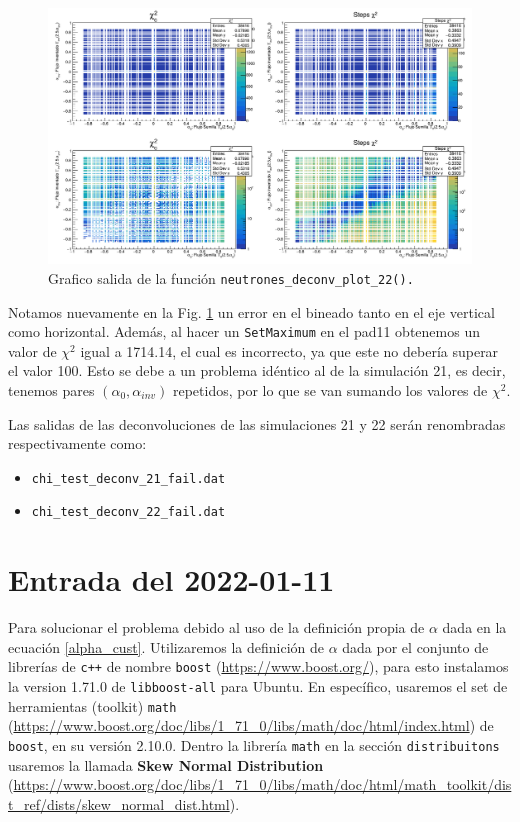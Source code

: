 \documentclass[11pt,letterpaper]{article}
\begin{document}
 \begin{figure}[H]
    \includegraphics[width=1.\textwidth]{img/plot_deconv_22_fail.png}
    \centering
     \cprotect\caption{Grafico salida de la función \verb|neutrones_deconv_plot_22().|} 
\label{neutrones_deconv_plot_22_fail}
\end{figure}

Notamos nuevamente en la  Fig. \ref{neutrones_deconv_plot_22_fail} un error en el bineado tanto en el eje vertical como horizontal. Además, al hacer un \verb|SetMaximum| en el pad11 obtenemos un valor de $\chi^2$ igual a 1714.14, el cual es incorrecto, ya que este no debería superar el valor 100. Esto se debe a un problema idéntico al de la simulación 21, es decir, tenemos pares $(\alpha_{0},\alpha_{inv})$ repetidos, por lo que se van sumando los valores de $\chi^2$.

Las salidas de las deconvoluciones de las simulaciones 21 y 22 serán renombradas respectivamente como:

\begin{itemize}
\item \verb|chi_test_deconv_21_fail.dat|
\item  \verb|chi_test_deconv_22_fail.dat| 
\end{itemize}

\section{Entrada del 2022-01-11}
\label{2022-01-11}


Para solucionar el problema debido al uso de la definición propia de $\alpha$ dada en la ecuación \eqref{alpha_cust}. Utilizaremos la definición de $\alpha$ dada por el conjunto de librerías de \verb|c++| de nombre \verb|boost| (\url{https://www.boost.org/}), para esto instalamos la version 1.71.0 de \verb|libboost-all| para Ubuntu. En específico, usaremos el set de herramientas (toolkit) \verb|math| (\url{https://www.boost.org/doc/libs/1_71_0/libs/math/doc/html/index.html}) de \verb|boost|, en su versión 2.10.0. Dentro la librería \verb|math| en la sección \verb|distribuitons| usaremos la llamada \textbf{Skew Normal Distribution} (\url{https://www.boost.org/doc/libs/1_71_0/libs/math/doc/html/math_toolkit/dist_ref/dists/skew_normal_dist.html}).
\end{document}
